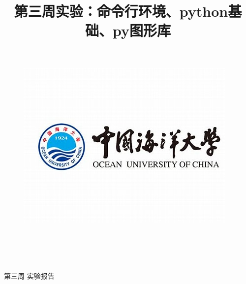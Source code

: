 \documentclass[UTF8]{ctexart}
\title{{\heiti  第三周实验：命令行环境、python基础、py图形库 }\vspace{-2em}}
\date{}
\begin{document}
\thispagestyle{empty}  %
\begin{figure}[tph!] %
	\centering
	\includegraphics[width=0.7\linewidth]{figure/2}
	
\end{figure}

\begin{center}%
	\quad \\ %
	\quad \\
	\quad \\
	\quad \\
	\heiti \fontsize{30}{17} \quad \quad 第\quad 三\quad 周\quad \quad \quad 
	\vskip 0.5cm
	\songti {} 实\quad 验\quad 报\quad 告%
\end{center}
\vskip 1cm
\end{document}
